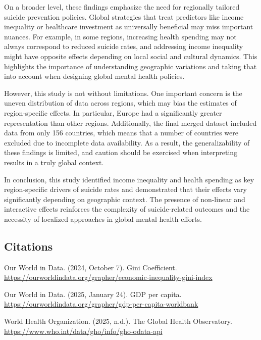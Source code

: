 \documentclass[
]{article}
\begin{document}
On a broader level, these findings emphasize the need for regionally
tailored suicide prevention policies. Global strategies that treat
predictors like income inequality or healthcare investment as
universally beneficial may miss important nuances. For example, in some
regions, increasing health spending may not always correspond to reduced
suicide rates, and addressing income inequality might have opposite
effects depending on local social and cultural dynamics. This highlights
the importance of understanding geographic variations and taking that
into account when designing global mental health policies.

However, this study is not without limitations. One important concern is
the uneven distribution of data across regions, which may bias the
estimates of region-specific effects. In particular, Europe had a
significantly greater representation than other regions. Additionally,
the final merged dataset included data from only 156 countries, which
means that a number of countries were excluded due to incomplete data
availability. As a result, the generalizability of these findings is
limited, and caution should be exercised when interpreting results in a
truly global context.

In conclusion, this study identified income inequality and health
spending as key region-specific drivers of suicide rates and
demonstrated that their effects vary significantly depending on
geographic context. The presence of non-linear and interactive effects
reinforces the complexity of suicide-related outcomes and the necessity
of localized approaches in global mental health efforts.

\newpage

\subsection{Citations}\label{citations}

Our World in Data. (2024, October 7). Gini Coefficient.
\url{https://ourworldindata.org/grapher/economic-inequality-gini-index}

Our World in Data. (2025, January 24). GDP per capita.
\url{https://ourworldindata.org/grapher/gdp-per-capita-worldbank}

World Health Organization. (2025, n.d.). The Global Health Observatory.
\url{https://www.who.int/data/gho/info/gho-odata-api}
\end{document}
